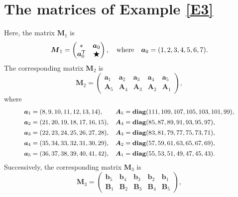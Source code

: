 \documentclass[12pt]{article}
\begin{document}
\section{The matrices of Example \ref{E3}}\label{B}
Here, the matrix $\boldsymbol{M}_{1}$ is
\begin{equation*}
	\boldsymbol{M}_{1}=\begin{pmatrix}
		* & \boldsymbol{a}_{0}\\
		\boldsymbol{a}_{0}^{{\rm T}} & \bigstar
	\end{pmatrix},
	\quad {\rm where}\quad\boldsymbol{a}_{0}=(1,2,3,4,5,6,7).
\end{equation*}
The corresponding matrix $\boldsymbol{M}_{2}$ is
\begin{equation*}
	\boldsymbol{M}_{2}=\begin{pmatrix}
		\boldsymbol{a}_{1} & \boldsymbol{a}_{2} & \boldsymbol{a}_{3} & \boldsymbol{a}_{4} & \boldsymbol{a}_{5}\\
		\boldsymbol{A}_{5} & \boldsymbol{A}_{4} & \boldsymbol{A}_{3} & \boldsymbol{A}_{2} & \boldsymbol{A}_{1}
	\end{pmatrix},
\end{equation*}
where
\begin{equation*}
	\small
	\begin{array}{ll}
		\boldsymbol{a}_{1}=(8,9,10,11,12,13,14),
		& \boldsymbol{A}_{5}={\rm\bf diag}(111,109,107,105,103,101,99),\\[4pt]
		\boldsymbol{a}_{2}=(21,20,19,18,17,16,15), &\boldsymbol{A}_{4}={\rm\bf diag}(85,87,89,91,93,95,97),\\[4pt] 
		\boldsymbol{a}_{3}=(22,23,24,25,26,27,28), 
		&\boldsymbol{A}_{3}={\rm\bf diag}(83,81,79,77,75,73,71),\\[4pt]
		\boldsymbol{a}_{4}=(35,34,33,32,31,30,29),
		&\boldsymbol{A}_{2}={\rm\bf diag}(57,59,61,63,65,67,69),\\[4pt] 
		\boldsymbol{a}_{5}=(36,37,38,39,40,41,42),
		&\boldsymbol{A}_{1}={\rm\bf diag}(55,53,51,49,47,45,43).
	\end{array}
\end{equation*}
Successively, the corresponding matrix $\boldsymbol{M}_{3}$ is
\begin{equation*}
	\boldsymbol{M}_{3}=\begin{pmatrix}
		\boldsymbol{b}_{5} & \boldsymbol{b}_{4} & \boldsymbol{b}_{3} & \boldsymbol{b}_{2} & \boldsymbol{b}_{1}\\
		\boldsymbol{B}_{1} & \boldsymbol{B}_{2} & \boldsymbol{B}_{3} & \boldsymbol{B}_{4} & \boldsymbol{B}_{5}
	\end{pmatrix},
\end{equation*}
\end{document}
